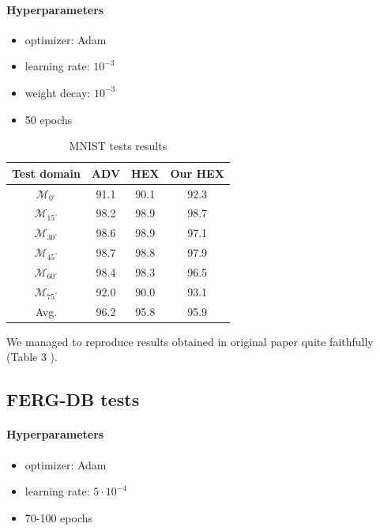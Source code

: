 \documentclass{article} %
\begin{document}
\paragraph{Hyperparameters} 
\begin{itemize}[noitemsep]
    \item optimizer: Adam
    \item learning rate: $10^{-3}$
    \item weight decay: $10^{-3}$
    \item 50 epochs
\end{itemize}

\begin{table}[H]
    \caption{MNIST tests results}
    \centering
    \begin{tabular}{cccc}
        \hline
        Test domain & ADV \citep{wang2018learning} & HEX \citep{wang2018learning} & Our HEX  \\
        \hline
        $\mathcal{M}_{0^{\circ}}$    & 91.1 & 90.1 & 92.3 \\
        $\mathcal{M}_{{15}^{\circ}}$ & 98.2 & 98.9 & 98.7 \\
        $\mathcal{M}_{{30}^{\circ}}$ & 98.6 & 98.9 & 97.1 \\
        $\mathcal{M}_{{45}^{\circ}}$ & 98.7 & 98.8 & 97.9 \\
        $\mathcal{M}_{{60}^{\circ}}$ & 98.4 & 98.3 & 96.5 \\
        $\mathcal{M}_{{75}^{\circ}}$ & 92.0 & 90.0 & 93.1 \\
        \hline
        Avg. & 96.2 & 95.8 & 95.9 \\
        \hline
        
    \end{tabular}
\end{table}

We managed to reproduce results obtained in original paper quite faithfully (Table 3 \citep{wang2018learning}).

\subsection{FERG-DB tests}

\paragraph{Hyperparameters} 
\begin{itemize}[noitemsep]
    \item optimizer: Adam
    \item learning rate: $5\cdot10^{-4}$
    \item 70-100 epochs
\end{itemize}
\end{document}
